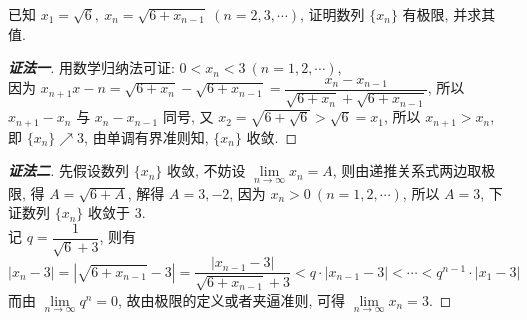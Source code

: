 \begin{example}
    已知 $x_1=\sqrt{6},~x_n=\sqrt{6+x_{n-1}}~  (n=2,3,\cdots)$, 证明数列 $\{x_n\}$ 有极限, 并求其值.
\end{example}
\begin{proof}[{\songti \textbf{证法一}}]
    用数学归纳法可证: $0<x_n<3~  (n=1,2,\cdots)$, \\
    因为 $x_{n+1}x-{n}=\sqrt{6+x_n}-\sqrt{6+x_{n-1}}=\dfrac{x_n-x_{n-1}}{\sqrt{6+x_n}+\sqrt{6+x_{n-1}}}$, 所以 $x_{n+1}-x_n$ 与 $x_n-x_{n-1}$ 同号, 
    又 $x_2=\sqrt{6+\sqrt{6}}>\sqrt{6}=x_1$, 所以 $x_{n+1}>x_{n}$, 即 $\{x_n\}\nearrow 3$, 由单调有界准则知, $\{x_n\}$ 收敛.
\end{proof}
\begin{proof}[{\songti \textbf{证法二}}]
    先假设数列 $\{x_n\}$ 收敛, 不妨设 $\lim\limits_{n\to\infty}x_n=A$, 则由递推关系式两边取极限, 得 $A=\sqrt{6+A}$, 解得 $A=3,-2$, 
    因为 $x_n>0~  (n=1,2,\cdots)$, 所以 $A=3$, 下证数列 $\{x_n\}$ 收敛于 $3$.\\
    记 $q=\dfrac{1}{\sqrt{6}+3}$, 则有
    $$|x_n-3|=\left|\sqrt{6+x_{n-1}}-3\right|=\dfrac{|x_{n-1}-3|}{\sqrt{6+x_{n-1}}+3}<q\cdot|x_{n-1}-3|<\cdots<q^{n-1}\cdot|x_1-3|$$
    而由 $\lim\limits_{n\to\infty}q^n=0$, 故由极限的定义或者夹逼准则, 可得 $\lim\limits_{n\to\infty}x_n=3.$
\end{proof}

